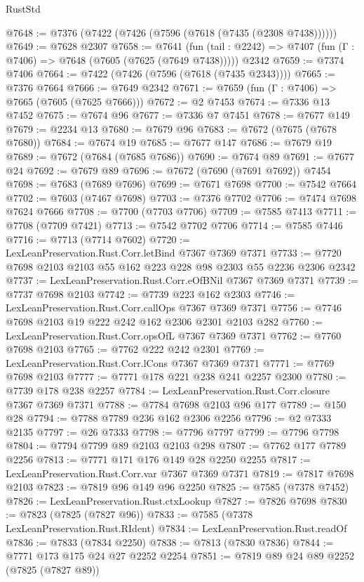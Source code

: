 \begin{lexlean}{RustStd}
\begin{coremodule}
@7648 := @7376 (@7422 (@7426 (@7596 (@7618 (@7435 (@2308 @7438))))))
@7649 := @7628 @2307
@7658 := @7641
    (fun (tail : @2242) => @7407 (fun (Γ : @7406) => @7648 (@7605 (@7625 (@7649 @7438)))))
    @2342
@7659 := @7374 @7406
@7664 := @7422 (@7426 (@7596 (@7618 (@7435 @2343))))
@7665 := @7376 @7664
@7666 := @7649 @2342
@7671 := @7659 (fun (Γ : @7406) => @7665 (@7605 (@7625 @7666)))
@7672 := @2 @7453
@7674 := @7336 @13 @7452
@7675 := @7674 @96
@7677 := @7336 @7 @7451
@7678 := @7677 @149
@7679 := @2234 @13
@7680 := @7679 @96
@7683 := @7672 (@7675 (@7678 @7680))
@7684 := @7674 @19
@7685 := @7677 @147
@7686 := @7679 @19
@7689 := @7672 (@7684 (@7685 @7686))
@7690 := @7674 @89
@7691 := @7677 @24
@7692 := @7679 @89
@7696 := @7672 (@7690 (@7691 @7692)) @7454
@7698 := @7683 (@7689 @7696)
@7699 := @7671 @7698
@7700 := @7542 @7664
@7702 := @7603 (@7467 @7698)
@7703 := @7376 @7702
@7706 := @7474 @7698 @7624 @7666
@7708 := @7700 (@7703 @7706)
@7709 := @7585 @7413
@7711 := @7708 (@7709 @7421)
@7713 := @7542 @7702 @7706
@7714 := @7585 @7446
@7716 := @7713 (@7714 @7602)
@7720 := LexLeanPreservation.Rust.Corr.letBind @7367 @7369 @7371
@7733 := @7720 @7698 @2103 @2103 @55 @162 @223 @228 @98 @2303 @55 @2236 @2306 @2342
@7737 := LexLeanPreservation.Rust.Corr.eOfBNil @7367 @7369 @7371
@7739 := @7737 @7698 @2103
@7742 := @7739 @223 @162 @2303
@7746 := LexLeanPreservation.Rust.Corr.callOps @7367 @7369 @7371
@7756 := @7746 @7698 @2103 @19 @222 @242 @162 @2306 @2301 @2103 @282
@7760 := LexLeanPreservation.Rust.Corr.opsOfL @7367 @7369 @7371
@7762 := @7760 @7698 @2103
@7765 := @7762 @222 @242 @2301
@7769 := LexLeanPreservation.Rust.Corr.lCons @7367 @7369 @7371
@7771 := @7769 @7698 @2103
@7777 := @7771 @178 @221 @238 @241 @2257 @2300
@7780 := @7739 @178 @238 @2257
@7784 := LexLeanPreservation.Rust.Corr.closure @7367 @7369 @7371
@7788 := @7784 @7698 @2103 @96 @177
@7789 := @150 @28
@7794 := @7788 @7789 @236 @162 @2306 @2256
@7796 := @2 @7333 @2135
@7797 := @26 @7333
@7798 := @7796 @7797
@7799 := @7796 @7798
@7804 := @7794 @7799 @89 @2103 @2103 @298
@7807 := @7762 @177 @7789 @2256
@7813 := @7771 @171 @176 @149 @28 @2250 @2255
@7817 := LexLeanPreservation.Rust.Corr.var @7367 @7369 @7371
@7819 := @7817 @7698 @2103
@7823 := @7819 @96 @149 @96 @2250
@7825 := @7585 (@7378 @7452)
@7826 := LexLeanPreservation.Rust.ctxLookup
@7827 := @7826 @7698
@7830 := @7823 (@7825 (@7827 @96))
@7833 := @7585 (@7378 LexLeanPreservation.Rust.RIdent)
@7834 := LexLeanPreservation.Rust.readOf
@7836 := @7833 (@7834 @2250)
@7838 := @7813 (@7830 @7836)
@7844 := @7771 @173 @175 @24 @27 @2252 @2254
@7851 := @7819 @89 @24 @89 @2252 (@7825 (@7827 @89))

\end{coremodule}
\end{lexlean}
